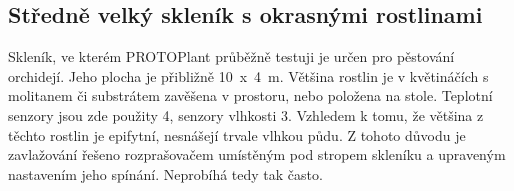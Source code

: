 \begin{table}[h]
    \centering
    \caption{Tabulka s cenovou kalkulací systému pro menší skleník.}
    \label{tab:SmallGreenhousePricing}
\end{table}

\subsection{Středně velký skleník s okrasnými rostlinami}
Skleník, ve kterém PROTOPlant průběžně testuji je určen pro pěstování orchidejí. 
Jeho plocha je přibližně 10~x~4~m.
Většina rostlin je v květináčích s molitanem či substrátem zavěšena v prostoru, nebo položena na stole.
Teplotní senzory jsou zde použity 4, senzory vlhkosti 3.
Vzhledem k tomu, že většina z těchto rostlin je epifytní, nesnášejí trvale vlhkou půdu. 
Z tohoto důvodu je zavlažování řešeno rozprašovačem umístěným pod stropem skleníku a upraveným nastavením jeho spínání.
Neprobíhá tedy tak často.

